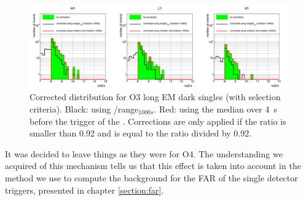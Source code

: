\begin{figure}[H]
  \centering
  \includegraphics[width=\linewidth]{sectionBadTriggers/PSD/Reweight/cThese2_darkLong.png}
  \caption{Corrected distribution for O3 long EM dark singles (with selection criteria). Black: using \medr{}/range$_{1000s}$. Red: using the median over \SI{4}{s} before the trigger of the \medr{}. Corrections are only applied if the ratio is smaller than 0.92 and is equal to the ratio divided by 0.92.}
  \label{fig:reweightDark_b}
\end{figure}

It was decided to leave things as they were for O4.
The understanding we acquired of this mechanism tells us that this effect is taken into account in the method we use to compute the background for the FAR of the single detector triggers, presented in chapter \ref{section:far}.














